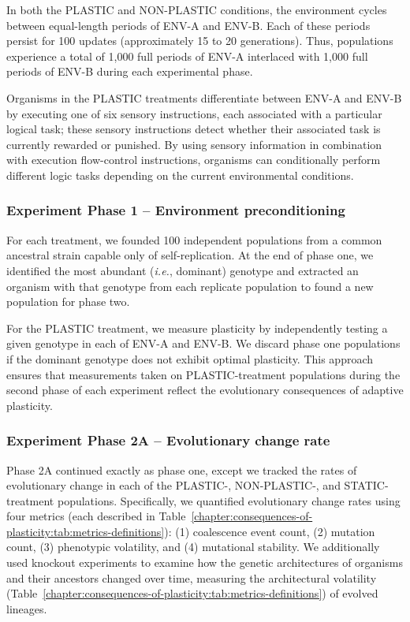 In both the PLASTIC and NON-PLASTIC conditions, the environment cycles between equal-length periods of ENV-A and ENV-B.
Each of these periods persist for 100 updates (approximately 15 to 20 generations).
Thus, populations experience a total of 1,000 full periods of ENV-A interlaced with 1,000 full periods of ENV-B during each experimental phase.

Organisms in the PLASTIC treatments differentiate between ENV-A and ENV-B by executing one of six sensory instructions, each associated with a particular logical task; these sensory instructions detect whether their associated task is currently rewarded or punished.
By using sensory information in combination with execution flow-control instructions, organisms can conditionally perform different logic tasks depending on the current environmental conditions.

\subsubsection{Experiment Phase 1 -- Environment preconditioning}
\label{chapter:consequences-of-plasticity:sec:methods:experiment:phase-one}

For each treatment, we founded 100 independent populations from a common ancestral strain capable only of self-replication.
At the end of phase one, we identified the most abundant (\textit{i.e.}, dominant) genotype and extracted an organism with that genotype from each replicate population to found a new population for phase two.

For the PLASTIC treatment, we measure plasticity by independently testing a given genotype in each of ENV-A and ENV-B.
We discard phase one populations if the dominant genotype does not exhibit optimal plasticity.
This approach ensures that measurements taken on PLASTIC-treatment populations during the second phase of each experiment reflect the evolutionary consequences of adaptive plasticity.

\subsubsection{Experiment Phase 2A -- Evolutionary change rate}
\label{chapter:consequences-of-plasticity:sec:methods:experiment:evolutionary-change-rate}

Phase 2A continued exactly as phase one, except we tracked the rates of evolutionary change in each of the PLASTIC-, NON-PLASTIC-, and STATIC-treatment populations. 
Specifically, we quantified evolutionary change rates using four metrics (each described in Table~\ref{chapter:consequences-of-plasticity:tab:metrics-definitions}):
(1) coalescence event count,
(2) mutation count, 
(3) phenotypic volatility,
and (4) mutational stability.
We additionally used knockout experiments to examine how the genetic architectures of organisms and their ancestors changed over time, measuring the architectural volatility (Table~\ref{chapter:consequences-of-plasticity:tab:metrics-definitions}) of evolved lineages.

